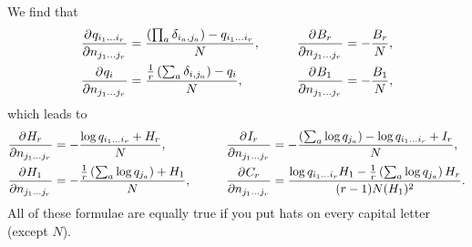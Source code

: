 \documentclass[12pt]{article}
\begin{document}
We find that
%
\begin{equation}\label{eq:dqbydn}
  \begin{aligned}
    \pdiff{q_{i_1\ldots i_r}}{n_{j_1\ldots j_r}} &= \frac{\prn{\prod_a \delta_{i_a,j_a}} - q_{i_1\ldots i_r}}{N}, &
    \qquad
    \pdiff{B_{r}}{n_{j_1\ldots j_r}} &= -\frac{B_r}{N},\\
    \pdiff{q_{i}}{n_{j_1\ldots j_r}} &= \frac{\frac{1}{r} \prn{\sum_a \delta_{i,j_a}} - q_{i}}{N}, &
    \pdiff{B_{1}}{n_{j_1\ldots j_r}} &= -\frac{B_1}{N}, 
   \end{aligned}
\end{equation}
%
which leads to
%
\begin{equation}\label{eq:dhbydn}
  \begin{aligned}
    \pdiff{H_r}{n_{j_1\ldots j_r}} &= -\frac{\log q_{i_1\ldots i_r} + H_r}{N}, &
    \qquad
    \pdiff{I_{r}}{n_{j_1\ldots j_r}} &= -\frac{\prn{\sum_a \log q_{j_a}}-\log q_{i_1\ldots i_r} + I_r}{N}, \\
    \pdiff{H_1}{n_{j_1\ldots j_r}} &= -\frac{\frac{1}{r} \prn{\sum_a \log q_{j_a}} + H_1}{N}, &
    \pdiff{C_{r}}{n_{j_1\ldots j_r}} &= \frac{\log q_{i_1\ldots i_r} H_1 - \frac{1}{r} \prn{\sum_a \log q_{j_a}} H_r}{(r-1)N(H_1)^2}.
   \end{aligned}
\end{equation}
%
All of these formulae are equally true if you put hats on every capital letter (except $N$).













\end{document}
